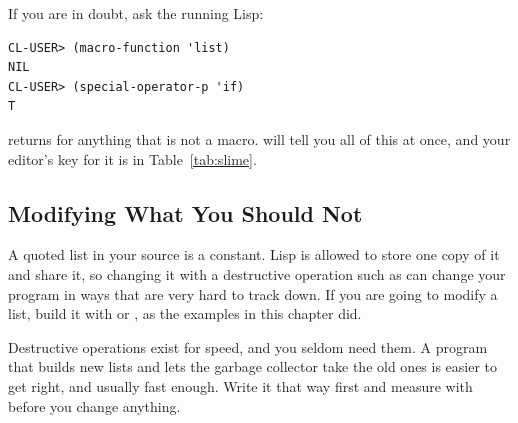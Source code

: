If you are in doubt, ask the running Lisp:

\begin{verbatim}
CL-USER> (macro-function 'list)
NIL
CL-USER> (special-operator-p 'if)
T
\end{verbatim}

\noindent
{} returns  for anything that is not a
macro.  will tell you all of this at once, and your
editor's key for it is in Table~\ref{tab:slime}.

\subsection{Modifying What You Should Not}

A quoted list in your source is a constant. Lisp is allowed to store
one copy of it and share it, so changing it with a destructive
operation such as  can change your program in ways that are
very hard to track down. If you are going to modify a list, build it
with  or , as the  examples in
this chapter did.

Destructive operations exist for speed, and you seldom need them. A
program that builds new lists and lets the garbage collector take the
old ones is easier to get right, and usually fast enough. Write it
that way first and measure with  before you change
anything.
